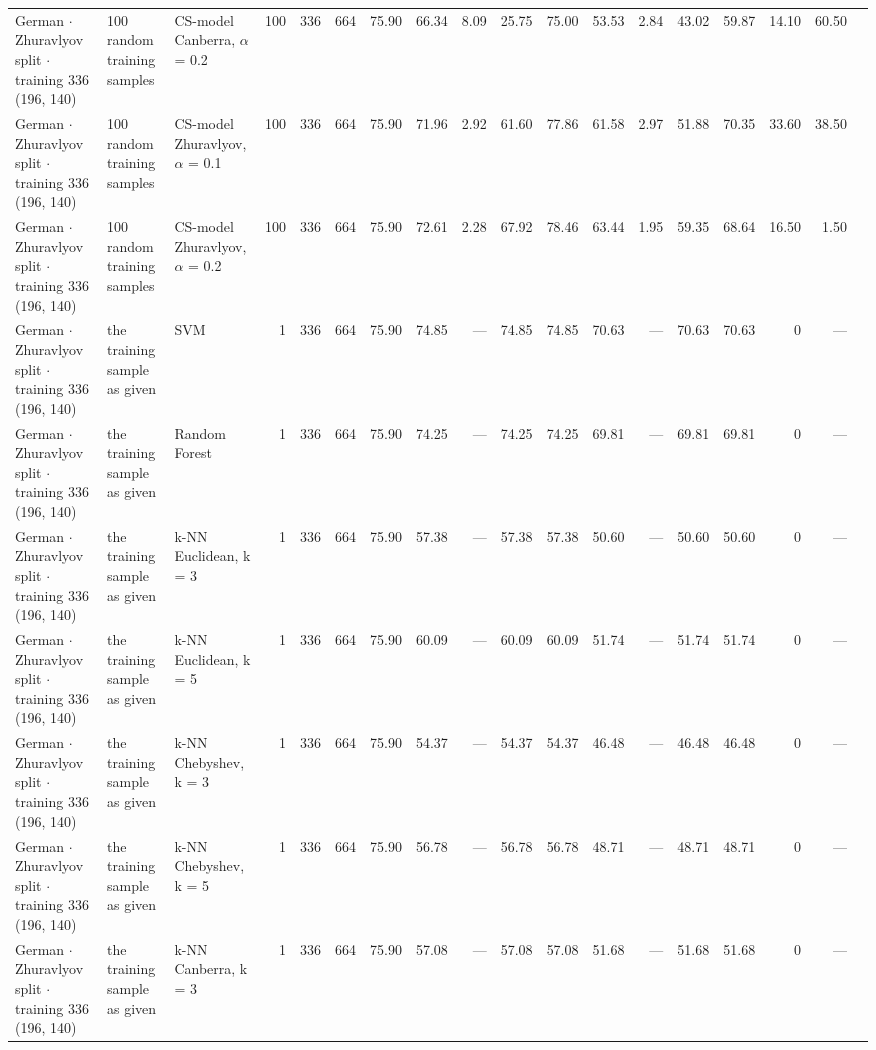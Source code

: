 \begin{longtable}{lllrrrrrrrrrrrrrrl}
  German $\cdot$ Zhuravlyov split $\cdot$ training 336 (196, 140) & 100 random training samples & CS-model Canberra, $\alpha$ = 0.2 & 100 & 336 & 664 & 75.90 & 66.34 & 8.09 & 25.75 & 75.00 & 53.53 & 2.84 & 43.02 & 59.87 & 14.10 & 60.50 &  \\
  German $\cdot$ Zhuravlyov split $\cdot$ training 336 (196, 140) & 100 random training samples & CS-model Zhuravlyov, $\alpha$ = 0.1 & 100 & 336 & 664 & 75.90 & 71.96 & 2.92 & 61.60 & 77.86 & 61.58 & 2.97 & 51.88 & 70.35 & 33.60 & 38.50 &  \\
  German $\cdot$ Zhuravlyov split $\cdot$ training 336 (196, 140) & 100 random training samples & CS-model Zhuravlyov, $\alpha$ = 0.2 & 100 & 336 & 664 & 75.90 & 72.61 & 2.28 & 67.92 & 78.46 & 63.44 & 1.95 & 59.35 & 68.64 & 16.50 & 1.50 &  \\
  German $\cdot$ Zhuravlyov split $\cdot$ training 336 (196, 140) & the training sample as given & SVM & 1 & 336 & 664 & 75.90 & 74.85 & --- & 74.85 & 74.85 & 70.63 & --- & 70.63 & 70.63 & 0 & --- &  \\
  German $\cdot$ Zhuravlyov split $\cdot$ training 336 (196, 140) & the training sample as given & Random Forest & 1 & 336 & 664 & 75.90 & 74.25 & --- & 74.25 & 74.25 & 69.81 & --- & 69.81 & 69.81 & 0 & --- &  \\
  German $\cdot$ Zhuravlyov split $\cdot$ training 336 (196, 140) & the training sample as given & k-NN Euclidean, k = 3 & 1 & 336 & 664 & 75.90 & 57.38 & --- & 57.38 & 57.38 & 50.60 & --- & 50.60 & 50.60 & 0 & --- &  \\
  German $\cdot$ Zhuravlyov split $\cdot$ training 336 (196, 140) & the training sample as given & k-NN Euclidean, k = 5 & 1 & 336 & 664 & 75.90 & 60.09 & --- & 60.09 & 60.09 & 51.74 & --- & 51.74 & 51.74 & 0 & --- &  \\
  German $\cdot$ Zhuravlyov split $\cdot$ training 336 (196, 140) & the training sample as given & k-NN Chebyshev, k = 3 & 1 & 336 & 664 & 75.90 & 54.37 & --- & 54.37 & 54.37 & 46.48 & --- & 46.48 & 46.48 & 0 & --- &  \\
  German $\cdot$ Zhuravlyov split $\cdot$ training 336 (196, 140) & the training sample as given & k-NN Chebyshev, k = 5 & 1 & 336 & 664 & 75.90 & 56.78 & --- & 56.78 & 56.78 & 48.71 & --- & 48.71 & 48.71 & 0 & --- &  \\
  German $\cdot$ Zhuravlyov split $\cdot$ training 336 (196, 140) & the training sample as given & k-NN Canberra, k = 3 & 1 & 336 & 664 & 75.90 & 57.08 & --- & 57.08 & 57.08 & 51.68 & --- & 51.68 & 51.68 & 0 & --- &  \\

\end{longtable}
